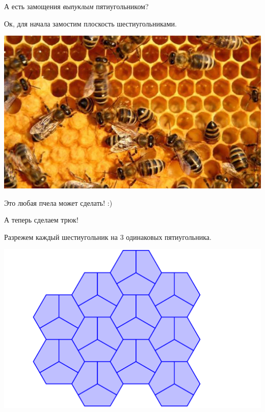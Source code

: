 \documentclass{beamer}
\begin{document}
\begin{frame}

А есть замощения \emph{выпуклым} пятиугольником?

\medskip

\pause

Ок, для начала замостим плоскость шестиугольниками.

\pause


\begin{center}
\includegraphics[width=.8\textwidth]{pcheli.jpg}
\end{center}

Это любая пчела может сделать! :)

\end{frame}

\begin{frame}

А теперь сделаем трюк!

Разрежем каждый шестиугольник на 3 одинаковых пятиугольника.

\vspace{-3ex}

\begin{center}
\includegraphics[width=\textwidth]{5-2.png}
\end{center}

\end{frame}
\end{document}
